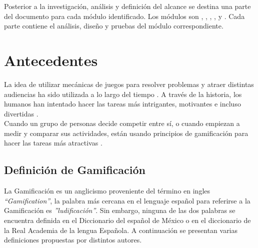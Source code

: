  \noindent Posterior a la investigación, análisis y definición del alcance se destina una parte del documento para cada módulo identificado. Los módulos son , , , ,  y . Cada parte contiene el análisis, diseño y pruebas del módulo correspondiente.

 \clearpage

\section{Antecedentes} \label{sec:antecedentes}

 La idea de utilizar mecánicas de juegos para resolver problemas y atraer distintas audiencias ha sido utilizada a lo largo del tiempo \cite{GamByDesign}. A través de la historia, los humanos han intentado hacer las tareas más intrigantes, motivantes e incluso divertidas \cite{Octalysis}.\\

 \noindent Cuando un grupo de personas decide competir entre sí, o cuando empiezan a medir y comparar sus actividades, están usando principios de gamificación para hacer las tareas más atractivas \cite[p. 7]{Octalysis}.

\subsection{Definición de Gamificación}

 La Gamificación es un anglicismo proveniente del término en ingles {\it ``Gamification''}, la palabra más cercana en el lenguaje español para referirse a la Gamificación es {\it ''ludificación''}. Sin embargo, ninguna de las dos palabras se encuentra definida en el Diccionario del español de México o en el diccionario de la Real Academia de la lengua Española. A continuación se presentan varias definiciones propuestas por distintos autores.


